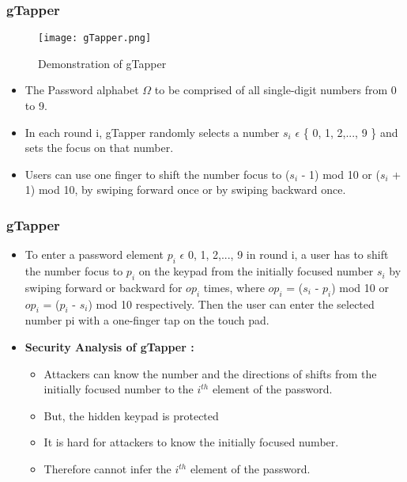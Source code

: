 \documentclass{beamer}
\begin{document}
\begin{frame}
\frametitle{gTapper}
\begin{figure}
    \begin{center}
        \texttt{[image: gTapper.png]}
        \caption{Demonstration of gTapper}
    \end{center}
\end{figure}

\justifying

\begin{itemize}
\justifying

\item The Password alphabet $\Omega$ to be comprised of all single-digit numbers from 0 to 9.
\item In each round i, gTapper randomly
selects a number \newline $s_i$ $\epsilon$ \{ 0, 1, 2,..., 9 \} and sets the focus on that number.

\item Users can use one finger to shift the number focus to \newline ($s_i$ - 1) mod 10 or
($s_i$ + 1) mod 10, by swiping forward once or by swiping backward once.

\end{itemize}
\end{frame}
\justifying
\begin{frame}
\frametitle{gTapper}
\begin{itemize}
\justifying

\item To enter a password element $p_i$ $\epsilon$ {0, 1, 2,..., 9} in round
i, a user has to shift the number focus to $p_i$ on the keypad
from the initially focused number $s_i$ by swiping forward or
backward for $op_i$ times, where $op_i$ = ($s_i$ - $p_i$) mod 10 or
$op_i$ = ($p_i$ - $s_i$) mod 10 respectively. Then the user can enter
the selected number pi with a one-finger tap on the touch
pad.

\item \textbf{Security Analysis of gTapper :}
\begin{itemize}
\justifying
\item Attackers can know the number and the directions of shifts from the initially focused number to the $i^{th}$ element of the password.

\item But, the hidden keypad is protected
\item It is hard for attackers
to know the initially focused number.
\item Therefore cannot infer the $i^{th}$ element of the password.
\end{itemize}
\end{itemize}
\end{frame}
\end{document}
